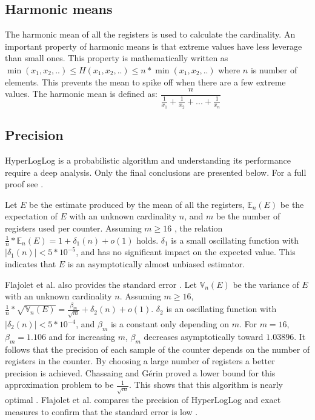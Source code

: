 \subsection{Harmonic means}
The harmonic mean of all the registers is used to calculate the cardinality. An important property of harmonic means is that extreme values have less leverage than small ones. This property is mathematically written as $\min(x_1,x_2,..) \leq H(x_1,x_2,..) \leq n*\min(x_1,x_2,..)$ where $n$ is number of elements. This prevents the mean to spike off when there are a few extreme values. The harmonic mean is defined as: $\dfrac{n}{\frac{1}{x_1}+\frac{1}{x_2}+...+\frac{1}{x_n}}$ 

\subsection{Precision}
HyperLogLog is a probabilistic algorithm and understanding its performance require a deep analysis. Only the final conclusions are presented below. For a full proof see \cite{hyperloglog}. 

Let $E$ be the estimate produced by the mean of all the registers, $\mathbb{E}_n(E)$ be the expectation of $E$ with an unknown cardinality $n$, and $m$ be the number of registers used per counter. Assuming $m \geq 16$ , the relation $\frac{1}{n}*\mathbb{E}_n(E) = 1 + \delta_1(n) + o(1)$ holds. $\delta_1$ is a small oscillating function with $|\delta_1(n)| < 5*10^{-5}$, and has no significant impact on the expected value. This indicates that $E$ is an asymptotically almost unbiased estimator.

Flajolet et al. also provides the standard error \cite{hyperloglog}. Let $\mathbb{V}_n(E)$ be the variance of $E$ with an unknown cardinality $n$. Assuming $m \geq 16$,  $\frac{1}{n}*\sqrt{\mathbb{V}_n(E)} = \frac{\beta_m}{\sqrt{m}}  + \delta_2(n) + o(1)$. $\delta_2$ is an oscillating function with $|\delta_2(n)| < 5*10^{-4}$, and $\beta_m$ is a constant only depending on $m$. For $m = 16$, $\beta_m = 1.106$ and for increasing $m$, $\beta_m$ decreases asymptotically toward $1.03896$. It follows that the precision of each sample of the counter depends on the number of registers in the counter. By choosing a large number of registers a better precision is achieved. Chassaing and Gérin proved a lower bound for this approximation problem to be $\frac{1}{\sqrt{m}}$. This shows that this algorithm is nearly optimal \cite{nearopt}. Flajolet et al. compares the precision of HyperLogLog and exact measures to confirm that the standard error is low \cite{hyperloglog}.

